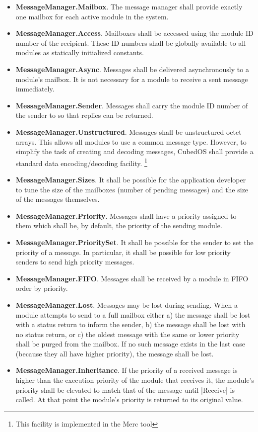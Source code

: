 \begin{itemize}
\item \textbf{MessageManager.Mailbox}. The message manager shall provide exactly one mailbox for
  each active module in the system.
\item \textbf{MessageManager.Access}. Mailboxes shall be accessed using the module ID number of
  the recipient. These ID numbers shall be globally available to all modules as statically
  initialized constants.
\item \textbf{MessageManager.Async}. Messages shall be delivered asynchronously to a module's
  mailbox. It is not necessary for a module to receive a sent message immediately.
\item \textbf{MessageManager.Sender}. Messages shall carry the module ID number of the sender to
  so that replies can be returned.
\item \textbf{MessageManager.Unstructured}. Messages shall be unstructured octet arrays. This
  allows all modules to use a common message type. However, to simplify the task of creating and
  decoding messages, CubedOS shall provide a standard data encoding/decoding facility.
  \footnote{This facility is implemented in the Merc tool}
\item \textbf{MessageManager.Sizes}. It shall be possible for the application developer to tune
  the size of the mailboxes (number of pending messages) and the size of the messages
  themselves.
\item \textbf{MessageManager.Priority}. Messages shall have a priority assigned to them which
  shall be, by default, the priority of the sending module.
\item \textbf{MessageManager.PrioritySet}. It shall be possible for the sender to set the
  priority of a message. In particular, it shall be possible for low priority senders to send
  high priority messages. 
\item \textbf{MessageManager.FIFO}. Messages shall be received by a module in FIFO order by
  priority.
\item \textbf{MessageManager.Lost}. Messages may be lost during sending. When a module attempts
  to send to a full mailbox either a) the message shall be lost with a status return to inform
  the sender, b) the message shall be lost with no status return, or c) the oldest message with
  the same or lower priority shall be purged from the mailbox. If no such message exists in the
  last case (because they all have higher priority), the message shall be lost.
\item \textbf{MessageManager.Inheritance}. If the priority of a received message is higher than
  the execution priority of the module that receives it, the module's priority shall be elevated
  to match that of the message until |Receive| is called. At that point the module's priority is
  returned to its original value. 
\end{itemize}

